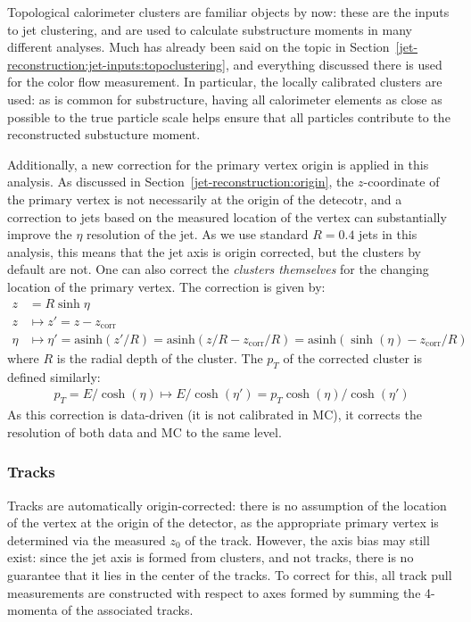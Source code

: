 Topological calorimeter clusters are familiar objects by now: these are the inputs to jet clustering, and are used to calculate substructure moments in many different analyses. Much has already been said on the topic in Section~\ref{jet-reconstruction:jet-inputs:topoclustering}, and everything discussed there is used for the color flow measurement. In particular, the locally calibrated clusters are used: as is common for substructure, having all calorimeter elements as close as possible to the true particle scale helps ensure that all particles contribute to the reconstructed substucture moment. 

Additionally, a new correction for the primary vertex origin is applied in this analysis. As discussed in Section~\ref{jet-reconstruction:origin}, the $z$-coordinate of the primary vertex is not necessarily at the origin of the detecotr, and a correction to jets based on the measured location of the vertex can substantially improve the $\eta$ resolution of the jet. As we use standard \akt $R=0.4$ jets in this analysis, this means that the jet axis is origin corrected, but the clusters by default are not. One can also correct the \textit{clusters themselves} for the changing location of the primary vertex. The correction is given by: 
%
\begin{align}
z &= R\sinh\eta\nonumber\\
z &\mapsto z' = z - z_\text{corr}\nonumber\\
\eta &\mapsto \eta' = \text{asinh} (z'/R) = \text{asinh}(z/R - z_\text{corr}/R) = \text{asinh}(\sinh(\eta) - z_\text{corr}/R)
\end{align}
%
where $R$ is the radial depth of the cluster. The $p_T$ of the corrected cluster is defined similarly:
%
\begin{align}
p_T=E/\cosh(\eta)\mapsto E/\cosh(\eta')=p_T\cosh(\eta)/\cosh(\eta')
\end{align}
%
As this correction is data-driven (it is not calibrated in MC), it corrects the resolution of both data and MC to the same level.

\subsubsection{Tracks}

Tracks are automatically origin-corrected: there is no assumption of the location of the vertex at the origin of the detector, as the appropriate primary vertex is determined via the measured $z_0$ of the track. However, the axis bias may still exist: since the jet axis is formed from clusters, and not tracks, there is no guarantee that it lies in the center of the tracks. To correct for this, all track pull measurements are constructed with respect to axes formed by summing the 4-momenta of the associated tracks.

